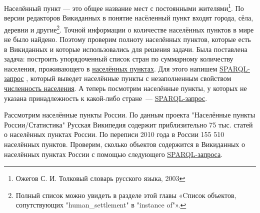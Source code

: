 Населённый пункт — это общее название мест с постоянными жителями\footnote {Ожегов С. И. Толковый словарь русского языка, 2003}. По версии редакторов Викиданных в понятие насёленный пункт входят города, сёла, деревни и другие\footnote{Полный список можно увидеть в разделе этой главы «Cписок объектов, сопутствующих "human\_settlement" в "instance of"».}.
Точной информации о количестве населённых пунктов в мире не было найдено. Поэтому проверим полноту населённых пунктов, которые есть в Викиданных и которые использовались для решения задачи. Была поставлена задача: построить упорядоченный список стран по суммарному количеству населения, проживающего в \href{http://www.wikidata.org/entity/Q486972}{населённых пунктах}. Для этого напишем \href{https://w.wiki/4FUz}{SPARQL-запрос} \footnotemark, который выведет населённые пункты с незаполненным свойством \href{http://www.wikidata.org/entity/P1082}{численность населения}. 
А теперь посмотрим населённые пункты, у которых не указана принадлежность к какой-либо стране~--- \href{https://w.wiki/4FV8}{SPARQL-запрос}\footnotemark.


Рассмотрим населённые пункты России. По данным проекта "Населённые пункты России/Статистика" Русская Википедия содержит приблизительно 75 тыс. статей о населённых пунктах России. По переписи 2010 года в России 155 510 населённых пунктов. Проверим, сколько объектов содержится в Викиданных о населённых пунктах России с помощью следующего \href{https://w.wiki/4FVE}{SPARQL-запроса}\protect\footnotemark. 


